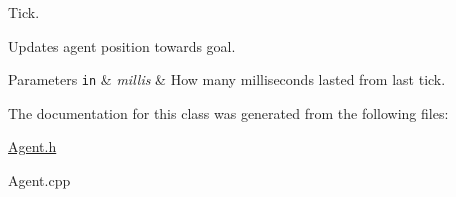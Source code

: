Tick. 

Updates agent position towards goal.


\begin{DoxyParams}[1]{Parameters}
\mbox{\tt in}  & {\em millis} & How many milliseconds lasted from last tick. \\
\hline
\end{DoxyParams}


The documentation for this class was generated from the following files\-:\begin{DoxyCompactItemize}
\item 
\hyperlink{_agent_8h}{Agent.\-h}\item 
Agent.\-cpp\end{DoxyCompactItemize}
